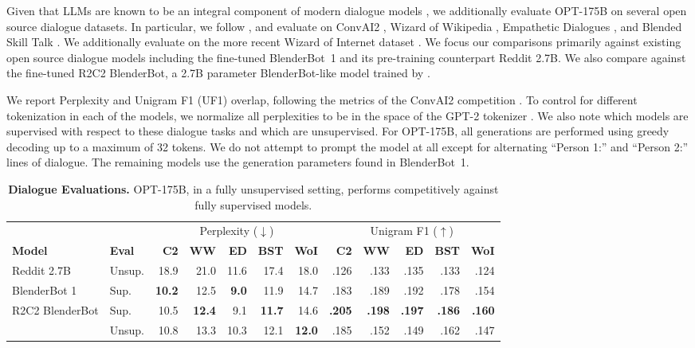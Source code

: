 \documentclass[11pt]{article}
\newcommand{\tablewhitespace}{\addlinespace[0.3em]}
\newcommand{\OPT}[0]{{OPT-175B}}
\begin{document}
Given that LLMs are known to be an integral component of modern dialogue models \cite{adiwardana2020meena,roller-etal-2021-recipes,thoppilan2022lamda,gopher2022,palm2022}, we additionally evaluate \OPT{} on several open source dialogue datasets. In particular, we follow \citet{roller-etal-2021-recipes}, and evaluate on ConvAI2 \cite{dinan2019second}, Wizard of Wikipedia \cite{dinan2018wizard}, Empathetic Dialogues \cite{rashkin2019empathetic}, and Blended Skill Talk \cite{smith2020bst}. We additionally evaluate on the more recent Wizard of Internet dataset \cite{komeili2021woi}.
We focus our comparisons primarily against existing open source dialogue models including the fine-tuned BlenderBot~1 \cite{roller-etal-2021-recipes} and its pre-training counterpart Reddit 2.7B. We also compare against the fine-tuned R2C2 BlenderBot, a 2.7B parameter BlenderBot-like model trained by \citet{shuster2022language}.

We report Perplexity and Unigram F1 (UF1) overlap, following the metrics of the ConvAI2 competition \cite{dinan2019second}. To control for different tokenization in each of the models, we normalize all perplexities to be in the space of the GPT-2 tokenizer \cite{radford2019language}. We also note which models are supervised with respect to these dialogue tasks and which are unsupervised. For \OPT{}, all generations are performed using greedy decoding up to a maximum of 32 tokens. We do not attempt to prompt the model at all except for alternating ``Person 1:'' and ``Person 2:'' lines of dialogue. The remaining models use the generation parameters found in BlenderBot~1.

\begin{table}[t]
    \centering
    \begin{tabular}{llrrrrrrrrrr}
    \toprule
    & & \multicolumn{5}{c}{Perplexity ($\downarrow$)} & \multicolumn{5}{c}{Unigram F1 ($\uparrow$)}\\
    \cmidrule(lr){3-7} \cmidrule(lr){8-12}
    {\bf Model} & {\bf Eval} & {\bf C2} & {\bf WW} & {\bf ED} & {\bf BST} & {\bf WoI} & {\bf C2} & {\bf WW} & {\bf ED} & {\bf BST} & {\bf WoI}\\
    \midrule
         Reddit 2.7B             & Unsup. &  18.9  &    21.0 & 11.6   & 17.4    & 18.0   & .126 & .133 & .135 & .133 & .124 \\
         BlenderBot 1            & Sup.   &{\bf10.2}  &    12.5 &{\bf9.0}& 11.9    & 14.7   & .183 & .189 & .192 & .178 & .154\\
         R2C2 BlenderBot             & Sup.   &  10.5  &   {\bf 12.4} &  9.1   &{\bf11.7}& 14.6   &{\bf.205}&{\bf.198}&{\bf.197}&{\bf.186}&{\bf.160}\\
         \tablewhitespace
         \OPT                    & Unsup. &  10.8 & 13.3 & 10.3  &  12.1 & {\bf 12.0} & .185 & .152 & .149 & .162 & .147\\
    \bottomrule
    \end{tabular}
    \caption{{\bf Dialogue Evaluations.} OPT-175B, in a fully unsupervised setting, performs competitively against fully supervised models.}
    \label{tab:dialogue_evals}
\end{table}
\end{document}
